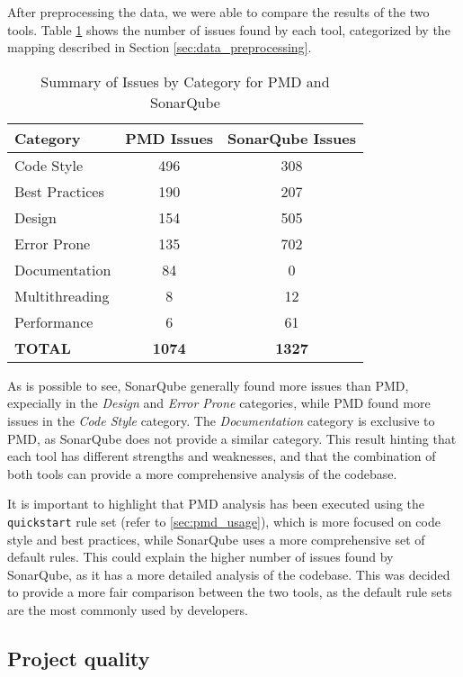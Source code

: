 After preprocessing the data, we were able to compare the results of the two tools. Table \ref{tab:sonarqube_pmd_comparison} shows the number of issues found by each tool, categorized by the mapping described in Section \ref{sec:data_preprocessing}.

\begin{table}[H]
  \centering
  \begin{tabular}{|l|c|c|}
  \hline
  \textbf{Category} & \textbf{PMD Issues} & \textbf{SonarQube Issues} \\
  \hline
  Code Style           & 496 & 308 \\
  Best Practices       & 190 & 207 \\
  Design               & 154 & 505 \\
  Error Prone          & 135 & 702 \\
  Documentation        & 84  & 0 \\
  Multithreading       & 8   & 12 \\
  Performance          & 6   & 61 \\
  \textbf{TOTAL}       & \textbf{1074} & \textbf{1327} \\
  \hline
  \end{tabular}
  \caption{Summary of Issues by Category for PMD and SonarQube}
  \label{tab:sonarqube_pmd_comparison}
\end{table}

\noindent As is possible to see, SonarQube generally found more issues than PMD, expecially in the \textit{Design} and \textit{Error Prone} categories, while PMD found more issues in the \textit{Code Style} category. The \textit{Documentation} category is exclusive to PMD, as SonarQube does not provide a similar category. This result hinting that each tool has different strengths and weaknesses, and that the combination of both tools can provide a more comprehensive analysis of the codebase.

It is important to highlight that PMD analysis has been executed using the \texttt{quickstart} rule set (refer to \autoref{sec:pmd_usage}), which is more focused on code style and best practices, while SonarQube uses a more comprehensive set of default rules. This could explain the higher number of issues found by SonarQube, as it has a more detailed analysis of the codebase. This was decided to provide a more fair comparison between the two tools, as the default rule sets are the most commonly used by developers.

\subsection{Project quality}


